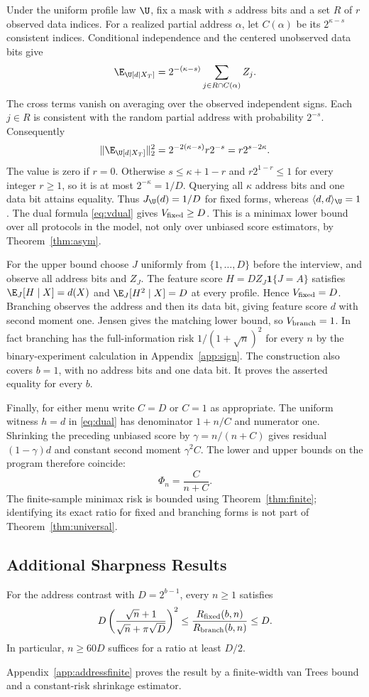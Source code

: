 Under the uniform profile law $\U$, fix a mask with $s$ address bits and a set $R$ of $r$ observed data indices. For a realized partial address $\alpha$, let $C(\alpha)$ be its $2^{\kappa-s}$ consistent indices. Conditional independence and the centered unobserved data bits give
\[
 \E_\U[d\mid X_T]
      =2^{-(\kappa-s)}\sum_{j\in R\cap C(\alpha)} Z_j.
\]
The cross terms vanish on averaging over the observed independent signs. Each $j\in R$ is consistent with the random partial address with probability $2^{-s}$. Consequently
\[
 \|\E_\U[d\mid X_T]\|_2^2
   =2^{-2(\kappa-s)} r2^{-s}=r2^{s-2\kappa}.
\]
The value is zero if $r=0$. Otherwise $s\le \kappa+1-r$ and $r2^{1-r}\le1$ for every integer $r\ge1$, so it is at most $2^{-\kappa}=1/D$. Querying all $\kappa$ address bits and one data bit attains equality. Thus $J_\U(d)=1/D$ for fixed forms, whereas $\langle d,d\rangle_\U=1$. The dual formula \eqref{eq:vdual} gives $V_{\rm fixed}\ge D$. This is a minimax lower bound over all protocols in the model, not only over unbiased score estimators, by Theorem~\ref{thm:asym}.

For the upper bound choose $J$ uniformly from $\{1,\ldots,D\}$ before the interview, and observe all address bits and $Z_J$. The feature score $H=DZ_J\mathbf1\{J=A\}$ satisfies $\E_J[H\mid X]=d(X)$ and $\E_J[H^2\mid X]=D$ at every profile. Hence $V_{\rm fixed}=D$. Branching observes the address and then its data bit, giving feature score $d$ with second moment one. Jensen gives the matching lower bound, so $V_{\rm branch}=1$. In fact branching has the full-information risk $1/(1+\sqrt n)^2$ for every $n$ by the binary-experiment calculation in Appendix~\ref{app:sign}. The construction also covers $b=1$, with no address bits and one data bit. It proves the asserted equality for every $b$.

Finally, for either menu write $C=D$ or $C=1$ as appropriate. The uniform witness $h=d$ in \eqref{eq:dual} has denominator $1+n/C$ and numerator one. Shrinking the preceding unbiased score by $\gamma=n/(n+C)$ gives residual $(1-\gamma)d$ and constant second moment $\gamma^2 C$. The lower and upper bounds on the program therefore coincide:
\[
 \Phi_n=\frac{C}{n+C}.
\]
The finite-sample minimax risk is bounded using Theorem~\ref{thm:finite}; identifying its exact ratio for fixed and branching forms is not part of Theorem~\ref{thm:universal}.

\subsection{Additional Sharpness Results}
\begin{proposition}\label{prop:finiteaddress}
For the address contrast with $D=2^{b-1}$, every $n\ge1$ satisfies
\[
 D\left(\frac{\sqrt n+1}{\sqrt n+\pi\sqrt D}\right)^2
 \le\frac{R_{\rm fixed}(b,n)}{R_{\rm branch}(b,n)}\le D.
\]
In particular, $n\ge60D$ suffices for a ratio at least $D/2$.
\end{proposition}
Appendix~\ref{app:addressfinite} proves the result by a finite-width van Trees bound and a constant-risk shrinkage estimator.

